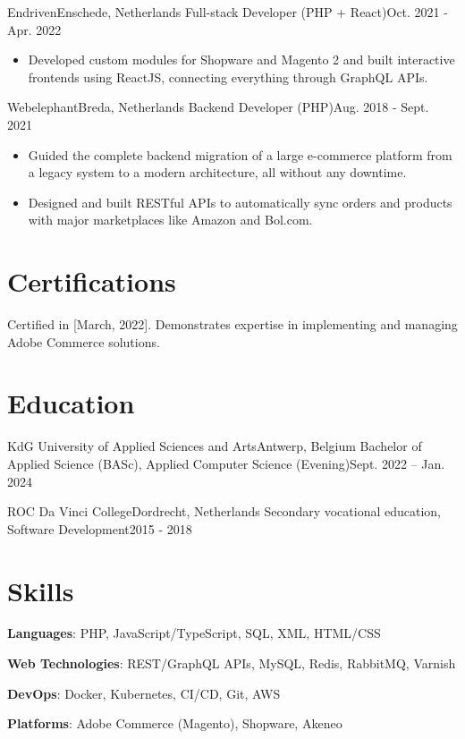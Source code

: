     \resumeSubheading
      {Endriven}{Enschede, Netherlands}
      {Full-stack Developer (PHP + React)}{Oct. 2021 - Apr. 2022}
      \begin{itemize}
        \item Developed custom modules for Shopware and Magento 2 and built interactive frontends using ReactJS, connecting everything through GraphQL APIs.
      \end{itemize}

    \resumeSubheading
      {Webelephant}{Breda, Netherlands}
      {Backend Developer (PHP)}{Aug. 2018 - Sept. 2021}
      \begin{itemize}
        \item Guided the complete backend migration of a large e-commerce platform from a legacy system to a modern architecture, all without any downtime.
        \item Designed and built RESTful APIs to automatically sync orders and products with major marketplaces like Amazon and Bol.com.
      \end{itemize}
      
  \resumeSubHeadingListEnd

\section{Certifications}
  \resumeSubHeadingListStart
      {Certified in [March, 2022]. Demonstrates expertise in implementing and managing Adobe Commerce solutions.}
  \resumeSubHeadingListEnd

\section{Education}
  \resumeSubHeadingListStart
    \resumeSubheading
      {KdG University of Applied Sciences and Arts}{Antwerp, Belgium}
      {Bachelor of Applied Science (BASc), Applied Computer Science (Evening)}{Sept. 2022 -- Jan. 2024}
      
    \resumeSubheading
      {ROC Da Vinci College}{Dordrecht, Netherlands}
      {Secondary vocational education, Software Development}{2015 - 2018}
  \resumeSubHeadingListEnd

\section{Skills}
 \resumeSubHeadingListStart
   \item{
     \textbf{Languages}{: PHP, JavaScript/TypeScript, SQL, XML, HTML/CSS}
   }
   \item{
     \textbf{Web Technologies}{: REST/GraphQL APIs, MySQL, Redis, RabbitMQ, Varnish}
   }
   \item{
     \textbf{DevOps}{: Docker, Kubernetes, CI/CD, Git, AWS}
   }
   \item{
      \textbf{Platforms}{: Adobe Commerce (Magento), Shopware, Akeneo}
   }
 \resumeSubHeadingListEnd

